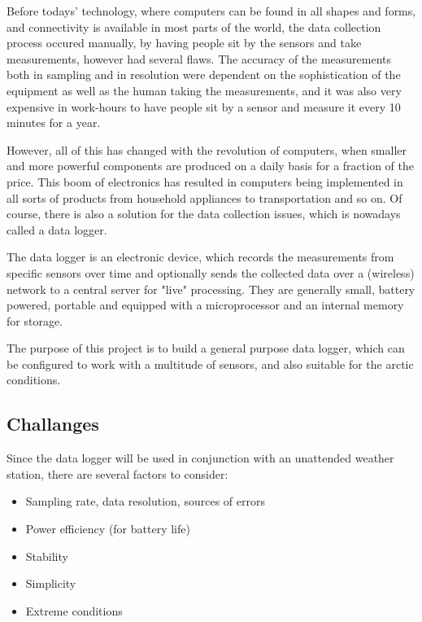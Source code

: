 \documentclass{project}
\begin{document}
Before todays' technology, where computers can be found in all shapes and forms, and connectivity is available in most parts of the world, the data collection process occured manually, by having people sit by the sensors and take measurements, however had several flaws. The accuracy of the measurements both in sampling and in resolution were dependent on the sophistication of the equipment as well as the human taking the measurements, and it was also very expensive in work-hours to have people sit by a sensor and measure it every 10 minutes for a year.

However, all of this has changed with the revolution of computers, when smaller and more powerful components are produced on a daily basis for a fraction of the price. This boom of electronics has resulted in computers being implemented in all sorts of products from household appliances to transportation and so on. Of course, there is also a solution for the data collection issues, which is nowadays called a data logger.

The data logger is an electronic device, which records the measurements from specific sensors over time and optionally sends the collected data over a (wireless) network to a central server for "live" processing. They are generally small, battery powered, portable and equipped with a microprocessor and an internal memory for storage. 

The purpose of this project is to build a general purpose data logger, which can be configured to work with a multitude of sensors, and also suitable for the arctic conditions.

\subsection{Challanges}

Since the data logger will be used in conjunction with an unattended weather station, there are several factors to consider:

\begin{itemize}\addtolength{\itemsep}{-0.5\baselineskip}
\item Sampling rate, data resolution, sources of errors
\item Power efficiency (for battery life)
\item Stability
\item Simplicity
\item Extreme conditions
\end{itemize}
\end{document}
